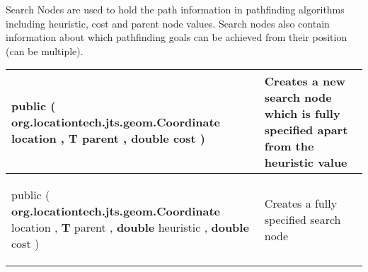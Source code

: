  {\scriptsize Search Nodes are used to hold the path information in pathfinding algorithms including heuristic, cost and parent node values. Search nodes also contain information about which\newline%
 pathfinding goals can be achieved from their position (can be multiple).
 
\vspace*{-5pt} 
\begin{tabularx}{\linewidth}{m{}|m{}}
\label{tab:SearchNode}
\begin{raggedleft}public  \textbf{\hyperref[tab:SearchNode]{\color{blue}{SearchNode}} }(\newline \hfill 
\hspace*{ 5pt} \textbf{org.locationtech.jts.geom.Coordinate} location , \newline
 \hspace*{ 5pt} \textbf{T} parent , \newline
 \hspace*{ 5pt} \textbf{double} cost  )
\end{raggedleft} &
 Creates a new  search node which is fully specified apart from\newline%
 the heuristic value\\ \hline 
\begin{raggedleft}public  \textbf{\hyperref[tab:SearchNode]{\color{blue}{SearchNode}} }(\newline \hfill 
\hspace*{ 5pt} \textbf{org.locationtech.jts.geom.Coordinate} location , \newline
 \hspace*{ 5pt} \textbf{T} parent , \newline
 \hspace*{ 5pt} \textbf{double} heuristic , \newline
 \hspace*{ 5pt} \textbf{double} cost  )
\end{raggedleft} &
 Creates a fully specified search node\\\end{tabularx}
}
